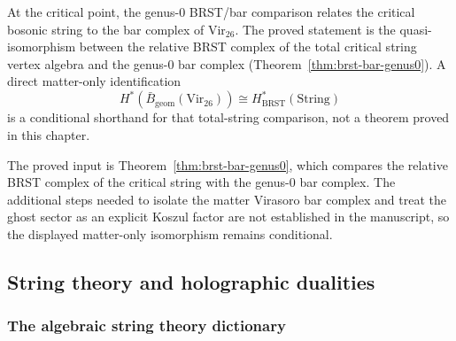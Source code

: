\begin{conjecture}\label{conj:virasoro-string}
At the critical point, the genus-$0$ BRST/bar comparison relates the
critical bosonic string to the bar complex of $\mathrm{Vir}_{26}$.
The proved statement is the
quasi-isomorphism between the relative BRST complex of the total
critical string vertex algebra and the genus-$0$ bar complex
\textup{(}Theorem~\ref{thm:brst-bar-genus0}\textup{)}. A direct
matter-only identification
\[
H^*(\bar{B}_{\mathrm{geom}}(\mathrm{Vir}_{26})) \cong
H^*_{\mathrm{BRST}}(\mathrm{String})
\]
is a conditional shorthand for that total-string comparison, not a
theorem proved in this chapter.
\end{conjecture}

\begin{remark}
The proved input is Theorem~\ref{thm:brst-bar-genus0}, which compares
the relative BRST complex of the critical string with the genus-$0$ bar
complex. The additional steps needed to isolate the matter Virasoro
bar complex and treat the ghost sector as an explicit Koszul factor are
not established in the manuscript, so the displayed matter-only
isomorphism remains conditional.
\end{remark}


\subsection{String theory and holographic dualities}

\subsubsection{The algebraic string theory dictionary}


